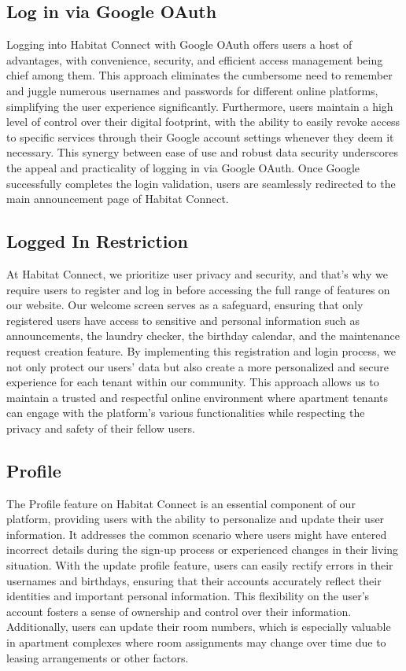 \documentclass[conference]{IEEEtran}
\begin{document}
\subsection{Log in via Google OAuth}
Logging into Habitat Connect with Google OAuth offers users a host of advantages, with convenience, security, and efficient access management being chief among them. This approach eliminates the cumbersome need to remember and juggle numerous usernames and passwords for different online platforms, simplifying the user experience significantly. Furthermore, users maintain a high level of control over their digital footprint, with the ability to easily revoke access to specific services through their Google account settings whenever they deem it necessary. This synergy between ease of use and robust data security underscores the appeal and practicality of logging in via Google OAuth. Once Google successfully completes the login validation, users are seamlessly redirected to the main announcement page of Habitat Connect.
\subsection{Logged In Restriction}
At Habitat Connect, we prioritize user privacy and security, and that's why we require users to register and log in before accessing the full range of features on our website. Our welcome screen serves as a safeguard, ensuring that only registered users have access to sensitive and personal information such as announcements, the laundry checker, the birthday calendar, and the maintenance request creation feature. By implementing this registration and login process, we not only protect our users' data but also create a more personalized and secure experience for each tenant within our community. This approach allows us to maintain a trusted and respectful online environment where apartment tenants can engage with the platform's various functionalities while respecting the privacy and safety of their fellow users.
\subsection{Profile}
The Profile feature on Habitat Connect is an essential component of our platform, providing users with the ability to personalize and update their user information. It addresses the common scenario where users might have entered incorrect details during the sign-up process or experienced changes in their living situation. With the update profile feature, users can easily rectify errors in their usernames and birthdays, ensuring that their accounts accurately reflect their identities and important personal information. This flexibility on the user’s account fosters a sense of ownership and control over their information. Additionally, users can update their room numbers, which is especially valuable in apartment complexes where room assignments may change over time due to leasing arrangements or other factors.
\end{document}

